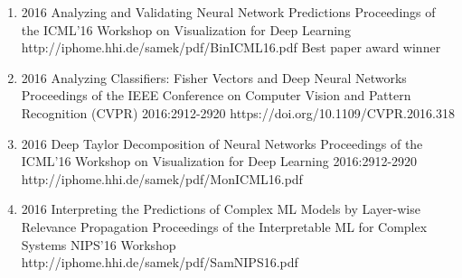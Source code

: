 \documentclass[10pt,a4paper]{article} %
\begin{document}
{\begin{enumerate}
        \item[] 
                                {2016}
                                {Analyzing and Validating Neural Network Predictions}
                                {Proceedings of the ICML'16 Workshop on Visualization for Deep Learning}
                                {}
                                {http://iphome.hhi.de/samek/pdf/BinICML16.pdf}
                                {Best paper award winner}

        \item[] 
                                {2016}
                                {Analyzing Classifiers: Fisher Vectors and Deep Neural Networks}
                                {Proceedings of the IEEE Conference on Computer Vision and Pattern Recognition (CVPR)}
                                {2016:2912-2920}
                                {https://doi.org/10.1109/CVPR.2016.318}

        \item[] 
                                {2016}
                                {Deep Taylor Decomposition of Neural Networks}
                                {Proceedings of the ICML'16 Workshop on Visualization for Deep Learning}
                                {2016:2912-2920}
                                {http://iphome.hhi.de/samek/pdf/MonICML16.pdf}

        \item[] 
                                {2016}
                                {Interpreting the Predictions of Complex ML Models by Layer-wise Relevance Propagation}
                                {Proceedings of the Interpretable ML for Complex Systems NIPS'16 Workshop}
                                {}
                                {http://iphome.hhi.de/samek/pdf/SamNIPS16.pdf}

    \end{enumerate}
}
\end{document}
